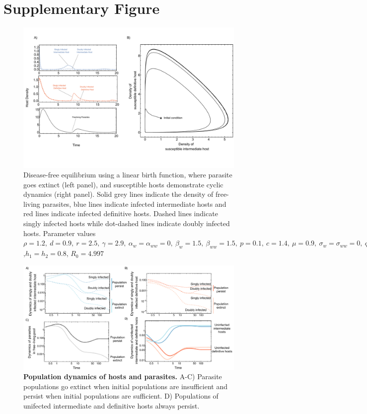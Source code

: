 \documentclass[11pt]{article}
\begin{document}
\section*{Supplementary Figure}
%
\begin{figure}[!ht]
\includegraphics[width=\textwidth]{diseasefree_linear.pdf}
\caption{Disease-free equilibrium using a linear birth function, where parasite goes extinct (left panel), and susceptible hosts demonstrate cyclic dynamics (right panel). 
Solid grey lines indicate the density of free-living parasites, blue lines indicate infected intermediate hosts and red lines indicate infected definitive hosts. 
Dashed lines indicate singly infected hosts while dot-dashed lines indicate doubly infected hosts. Parameter values  $\rho = 1.2, \  d = 0.9, \  r = 2.5, \ \gamma = 2.9, \ \alpha_w =  \alpha_{ww} =  0, \ \beta_w  = 1.5, \ \beta_{ww} = 1.5, \ p = 0.1,  \ c = 1.4, \ \mu = 0.9,  \ \sigma_w = \sigma_{ww} = 0, \ q = 0.01, \  f_w = 6.5, \  f_{ww} = 7.5, \ \delta = 0.9$,$h_1 = h_2 = 0.8$, $R_0 = 4.997$ } 
\end{figure}

\clearpage

\begin{figure}[!ht]
	\includegraphics[width = \textwidth]{supplement_dynamics_bifurcation.pdf}
	\caption{\textbf{Population dynamics of hosts and parasites.} A-C) Parasite populations go extinct when initial populations are insufficient and persist when initial populations are sufficient. D) Populations of unifected intermediate and definitive hosts always persist.}
\end{figure}
\clearpage
\end{document}
